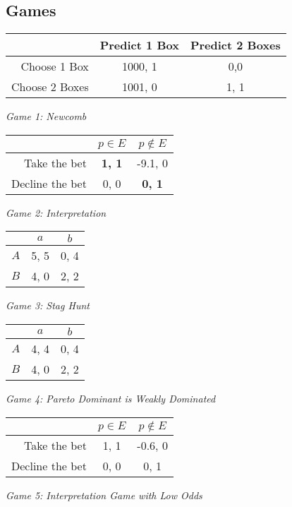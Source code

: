 

\subsection*{Games}

\begin{center}
\begin{tabular}{r | c c}
& Predict 1 Box & Predict 2 Boxes \\ \hline
Choose 1 Box & 1000, 1 & 0,0 \\
Choose 2 Boxes & 1001, 0 & 1, 1
\end{tabular}

\medskip
\textit{Game 1: Newcomb}

\bigskip
\bigskip

\begin{tabular}{r | c c}
& $p \in E$ & $p \notin E$ \\ \hline
Take the bet & \textbf{1, 1} & -9.1, 0 \\
Decline the bet & 0, 0 & \textbf{0, 1}
\end{tabular}

\medskip
\textit{Game 2: Interpretation}

\bigskip
\bigskip

\begin{tabular}{r | c c}
& $a$ & $b$  \\\hline
$A$ & 5, 5 & 0, 4 \\
$B$ & 4, 0 & 2, 2
\end{tabular}

\medskip
\textit{Game 3: Stag Hunt}

\bigskip
\bigskip

\begin{tabular}{r | c c}
& $a$ & $b$ \\ \hline
$A$ & 4, 4 & 0, 4 \\
$B$ & 4, 0 & 2, 2
\end{tabular}

\medskip
\textit{Game 4: Pareto Dominant is Weakly Dominated}

\bigskip
\bigskip

\begin{tabular}{r | c c}
& $p \in E$ & $p \notin E$ \\ \hline
Take the bet & 1, 1 & -0.6, 0 \\
Decline the bet & 0, 0 & 0, 1
\end{tabular}

\medskip
\textit{Game 5: Interpretation Game with Low Odds}
\end{center}

